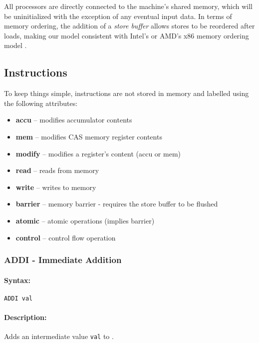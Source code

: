 All processors are directly connected to the machine's shared memory, which will be uninitialized with the exception of any eventual input data.
In terms of memory ordering, the addition of a \emph{store buffer} allows stores to be reordered after loads, making our model consistent with Intel's or AMD's x86 memory ordering model \cite{intel, amd}.

\subsection{Instructions}

To keep things simple, instructions are not stored in memory and labelled using the following attributes:


\begin{itemize}
  \item \textbf{accu} -- modifies accumulator contents
  \item \textbf{mem} -- modifies CAS memory register contents
  \item \textbf{modify} -- modifies a register's content (accu or mem)
  \item \textbf{read} -- reads from memory
  \item \textbf{write} -- writes to memory
  \item \textbf{barrier} -- memory barrier - requires the store buffer to be flushed
  \item \textbf{atomic} -- atomic operations (implies barrier)
  \item \textbf{control} -- control flow operation
\end{itemize}

\subsubsection{ADDI - Immediate Addition}

\paragraph{Syntax:} \texttt{ADDI val}
\paragraph{Description:} Adds an intermediate value \texttt{val} to \accu.

